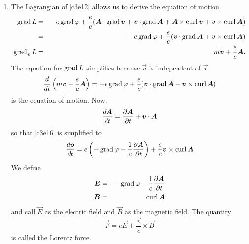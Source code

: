 \begin{enumerate}
\item The Lagrangian of \eqref{c3e12} allows us to derive the equation of motion.
\begin{eqnarray*}
\operatorname{grad} L &=& -e\operatorname{grad}\varphi + \frac{e}{c}(\boldsymbol{A}\cdot\operatorname{grad}\boldsymbol{v} + 
 \boldsymbol{v}\cdot\operatorname{grad}\boldsymbol{A} + \boldsymbol{A}\times\operatorname{curl}\boldsymbol{v} + \boldsymbol{v}\times\operatorname{curl}\boldsymbol{A})\\ 
 &=& -e\operatorname{grad}\varphi + \frac{e}{c}(\boldsymbol{v}\cdot\operatorname{grad}\boldsymbol{A} + \boldsymbol{v}\times\operatorname{curl}\boldsymbol{A})\\ 
\operatorname{grad}_{\boldsymbol{v}}L &=& m\boldsymbol{v} + \frac{e}{c}\boldsymbol{A}.
\end{eqnarray*}
The equation for $\operatorname{grad} L$ simplifies because $\vec{v}$ is independent of $\vec{x}$.
\begin{equation}\label{c3e16}
\frac{d}{dt}\left(m\boldsymbol{v} + \frac{e}{c}\boldsymbol{A}\right) = 
-e\operatorname{grad}\varphi + \frac{e}{c}(\boldsymbol{v}\cdot\operatorname{grad}\boldsymbol{A} + \boldsymbol{v}\times\operatorname{curl}\boldsymbol{A})
\end{equation}
is the equation of motion. Now.
\begin{equation}\label{c3e17}
\frac{d{\boldsymbol{A}}}{d{t}} = \frac{\partial{\boldsymbol{A}}}{\partial{t}} + \boldsymbol{v}\cdot\boldsymbol{A}
\end{equation}
so that \eqref{c3e16} is simplified to
\begin{equation}\label{c3e18}
\frac{d{\boldsymbol{p}}}{d{t}} = e\left(-\operatorname{grad}\varphi - \frac{1}{c}\frac{\partial{\boldsymbol{A}}}{\partial{t}}\right)
+ \frac{e}{c}\boldsymbol{v}\times\operatorname{curl}\boldsymbol{A}
\end{equation}
We define
\begin{eqnarray}
\boldsymbol{E} &=& -\operatorname{grad}\varphi - \frac{1}{c}\frac{\partial{\boldsymbol{A}}}{\partial{t}} \label{c3e19} \\
\boldsymbol{B} &=& \operatorname{curl}\boldsymbol{A} \label{c3e20}
\end{eqnarray}
and call $\vec{E}$ as the electric field and $\vec{B}$ as the magnetic field. The
quantity
\begin{equation}\label{c3e21}
\vec{F} = e\vec{E} + \frac{\vec{v}}{c}\times\vec{B}
\end{equation}
is called the Lorentz force.


\end{enumerate}
